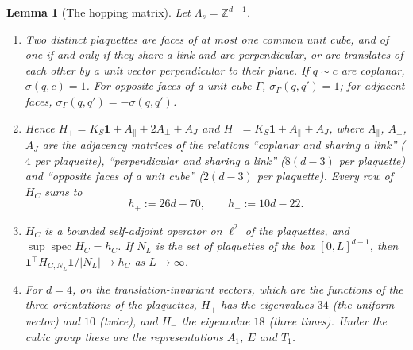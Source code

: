 \documentclass[11pt,a4paper]{article}
\newtheorem{lemma}[theorem]{Lemma}
\theoremstyle{definition}
\theoremstyle{remark}
\DeclareMathOperator{\spec}{spec}
\newcommand{\Z}{\mathbb{Z}}
\begin{document}
\begin{lemma}[The hopping matrix]\label{mg:lem:hopping}
Let $\Lambda_s=\Z^{d-1}$.
\begin{enumerate}[label=(\roman*)]
\item Two distinct plaquettes are faces of at most one common unit cube, and of one if and only if they share a link and are perpendicular, or are
translates of each other by a unit vector perpendicular to their plane. If $q\sim c$ are coplanar, $\sigma(q,c)=1$. For opposite faces of a unit cube
$\Gamma$, $\sigma_\Gamma(q,q')=1$; for adjacent faces, $\sigma_\Gamma(q,q')=-\sigma(q,q')$.
\item Hence $H_+=K_S\mathbf 1+A_\parallel+2A_\perp+A_J$ and $H_-=K_S\mathbf 1+A_\parallel+A_J$, where $A_\parallel$, $A_\perp$, $A_J$ are the adjacency
matrices of the relations ``coplanar and sharing a link'' ($4$ per plaquette), ``perpendicular and sharing a link'' ($8(d-3)$ per plaquette) and
``opposite faces of a unit cube'' ($2(d-3)$ per plaquette). Every row of $H_C$ sums to
\[
h_+:=26d-70,\qquad h_-:=10d-22 .
\]
\item $H_C$ is a bounded self-adjoint operator on $\ell^2$ of the plaquettes, and $\sup\spec H_C=h_C$. If $N_L$ is the set of plaquettes of the box
$[0,L]^{d-1}$, then $\mathbf 1^\top H_{C,N_L}\mathbf 1/|N_L|\to h_C$ as $L\to\infty$.
\item For $d=4$, on the translation-invariant vectors, which are the functions of the three orientations of the plaquettes, $H_+$ has the eigenvalues
$34$ (the uniform vector) and $10$ (twice), and $H_-$ the eigenvalue $18$ (three times). Under the cubic group these are the representations $A_1$, $E$
and $T_1$.
\end{enumerate}
\end{lemma}
\end{document}
